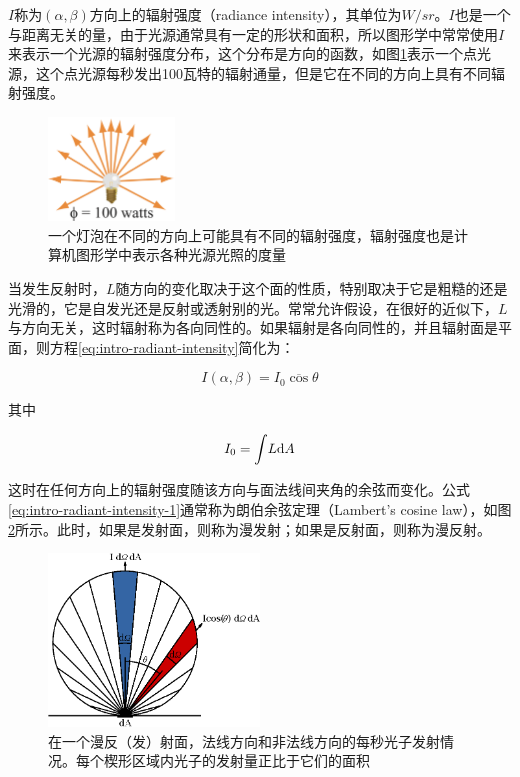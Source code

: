 \noindent $I$称为$(\alpha,\beta)$方向上的辐射强度（radiance intensity），其单位为$W/sr$。$I$也是一个与距离无关的量，由于光源通常具有一定的形状和面积，所以图形学中常常使用$I$来表示一个光源的辐射强度分布，这个分布是方向的函数，如图\ref{f:intro-radiant-intensity}表示一个点光源，这个点光源每秒发出100瓦特的辐射通量，但是它在不同的方向上具有不同辐射强度。

\begin{figure}
\sidecaption
	\includegraphics[width=0.3\textwidth]{figures/intro/radiant-intensity}
	\caption{一个灯泡在不同的方向上可能具有不同的辐射强度，辐射强度也是计算机图形学中表示各种光源光照的度量}
	\label{f:intro-radiant-intensity}
\end{figure}

当发生反射时，$L$随方向的变化取决于这个面的性质，特别取决于它是粗糙的还是光滑的，它是自发光还是反射或透射别的光。常常允许假设，在很好的近似下，$L$与方向无关，这时辐射称为各向同性的。如果辐射是各向同性的，并且辐射面是平面，则方程\ref{eq:intro-radiant-intensity}简化为：

\begin{equation}\label{eq:intro-radiant-intensity-1}
	I(\alpha,\beta)=I_0 \overline{\cos}\theta 
\end{equation}

\noindent 其中

\begin{equation}
	I_0={\rm \int} L{\rm d}A
\end{equation}

\noindent 这时在任何方向上的辐射强度随该方向与面法线间夹角的余弦而变化。公式\ref{eq:intro-radiant-intensity-1}通常称为朗伯余弦定理（Lambert's cosine law），如图\ref{f:intro-lambert-cosine-law}所示。此时，如果是发射面，则称为漫发射；如果是反射面，则称为漫反射。

\begin{figure}
\sidecaption
	\includegraphics[width=0.5\textwidth]{figures/intro/Lambert_Cosine_Law}
	\caption{在一个漫反（发）射面，法线方向和非法线方向的每秒光子发射情况。每个楔形区域内光子的发射量正比于它们的面积}
	\label{f:intro-lambert-cosine-law}
\end{figure}





